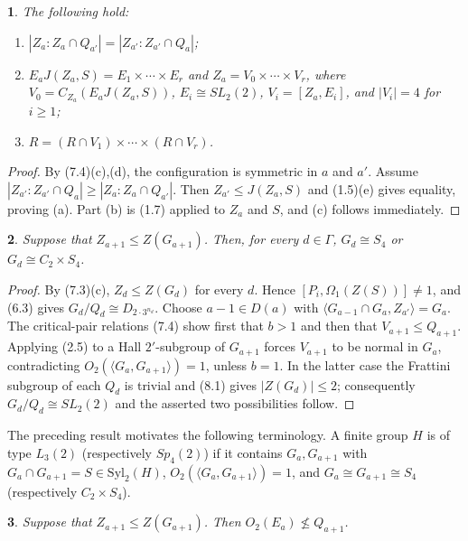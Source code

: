 \documentclass[11pt]{article}
\theoremstyle{plain}
\theoremstyle{stmplain}
\newtheorem{stm}{}[section]
\begin{document}
\begin{stm}\label{st:8.1}
The following hold:
\begin{enumerate}
\item[(a)] $|Z_a:Z_a\cap Q_{a'}|=|Z_{a'}:Z_{a'}\cap Q_a|$;
\item[(b)] $E_aJ(Z_a,S)=E_1\times\cdots\times E_r$ and
  $Z_a=V_0\times\cdots\times V_r$, where
  $V_0=C_{Z_a}(E_aJ(Z_a,S))$, $E_i\cong SL_2(2)$,
  $V_i=[Z_a,E_i]$, and $|V_i|=4$ for $i\ge1$;
\item[(c)] $R=(R\cap V_1)\times\cdots\times(R\cap V_r)$.
\end{enumerate}
\end{stm}

\begin{proof}
By (7.4)(c),(d), the configuration is symmetric in $a$ and $a'$. Assume
$|Z_{a'}:Z_{a'}\cap Q_a|\ge |Z_a:Z_a\cap Q_{a'}|$. Then
$Z_{a'}\le J(Z_a,S)$ and (1.5)(e) gives equality, proving (a).
Part (b) is (1.7) applied to $Z_a$ and $S$, and (c) follows immediately.
\end{proof}

\begin{stm}\label{st:8.2}
Suppose that $Z_{a+1}\le Z(G_{a+1})$. Then, for every $d\in\Gamma$,
$G_d\cong S_4$ or $G_d\cong C_2\times S_4$.
\end{stm}

\begin{proof}
By (7.3)(c), $Z_d\le Z(G_d)$ for every $d$. Hence
$[P_i,\Omega_1(Z(S))]\ne1$, and (6.3) gives
$G_d/Q_d\cong D_{2\cdot3^{n_d}}$. Choose
$a-1\in D(a)$ with $\langle G_{a-1}\cap G_a,Z_{a'}\rangle=G_a$.
The critical-pair relations (7.4) show first that $b>1$ and then that
$V_{a+1}\le Q_{a+1}$. Applying (2.5) to a Hall $2'$-subgroup of
$G_{a+1}$ forces $V_{a+1}$ to be normal in $G_a$, contradicting
$O_2(\langle G_a,G_{a+1}\rangle)=1$, unless $b=1$. In the latter case
the Frattini subgroup of each $Q_d$ is trivial and (8.1) gives
$|Z(G_d)|\le2$; consequently $G_d/Q_d\cong SL_2(2)$ and the asserted
two possibilities follow.
\end{proof}

\noindent The preceding result motivates the following terminology. A finite
group $H$ is of type $L_3(2)$ (respectively $Sp_4(2)$) if it contains
$G_a,G_{a+1}$ with $G_a\cap G_{a+1}=S\in\mathrm{Syl}_2(H)$,
$O_2(\langle G_a,G_{a+1}\rangle)=1$, and
$G_a\cong G_{a+1}\cong S_4$ (respectively $C_2\times S_4$).

\begin{stm}\label{st:8.3}
Suppose that $Z_{a+1}\le Z(G_{a+1})$. Then
$O_2(E_a)\nleq Q_{a+1}$.
\end{stm}
\end{document}
